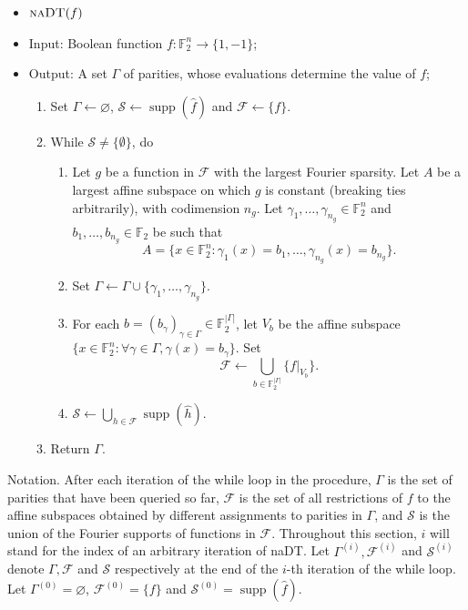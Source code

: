 \documentclass[11pt]{article}
\numberwithin{equation}{section}
\theoremstyle{definition}
\theoremstyle{plain}
\DeclareMathOperator{\Supp}{supp}
\newcommand{\F}{{\mathbb F}}
\begin{document}
\newcommand{\nadtproc}{\text{\sc naDT}}
\begin{itemize}
\item[] $\nadtproc(f)$
\item[] Input: Boolean function $f: \F_2^n \to \{1,-1\}$;
\item[] Output: A set $\Gamma$ of parities, whose evaluations determine the value of $f$;
\begin{enumerate}
\item Set $\Gamma \gets \varnothing$, $\mathcal{S} \gets\Supp(\widehat{f})$
  and 
  $\mathcal{F} \gets \{f\}$.
\item\label{step:while} While $\mathcal{S} \neq \{\emptyset\}$, do
\begin{enumerate}
\item\label{step:chooseg} Let $g$ be a function in $\mathcal{F}$ with the largest Fourier
  sparsity. Let $A$ be a largest
  affine subspace on which $g$ is constant (breaking ties arbitrarily), with codimension $n_g$.  Let $\gamma_1,\ldots,\gamma_{n_g} \in \F_2^n$ and
  $b_1, \ldots, b_{n_g} \in \mathbb{F}_2$ be such that
  \[
    A=\{x \in \F_2^n :
    \gamma_1(x)=b_1, \ldots, \gamma_{n_g}(x) = b_{n_g}\}.
  \]
\item Set $\Gamma \gets \Gamma \cup \{\gamma_1,\ldots,
  \gamma_{n_g}\}$.
\item For each $b=(b_\gamma)_{\gamma \in \Gamma} \in
  \mathbb{F}_2^{|\Gamma|}$, let $V_b$ be the affine subspace $\{x \in \F_2^n:
  \forall \gamma \in \Gamma, \gamma(x) = b_\gamma\}$.  Set
  \[
    \mathcal{F} \gets \bigcup_{b \in \mathbb{F}_2^{|\Gamma|}} \{f |_{V_b}\}.
  \]
\item $\mathcal{S} \gets \bigcup_{h \in \mathcal{F}} \Supp(\widehat{h})$.
\end{enumerate}
\item Return $\Gamma$.
\end{enumerate}
\end{itemize}
\noindent   %
Notation.  %
After each iteration of the while loop in the procedure,
$\Gamma$ is the set of parities that have been queried so far,
$\mathcal{F}$ is the set of all restrictions of $f$ to the affine
subspaces obtained by different assignments to parities in $\Gamma$,
and $\mathcal{S}$ is the union of the Fourier supports of functions in
$\mathcal{F}$. Throughout this section, $i$ will stand for the index of an arbitrary iteration
of {\sc naDT}. Let  $\Gamma^{(i)}, \mathcal{F}^{(i)}$ and
$\mathcal{S}^{(i)}$ denote $\Gamma, \mathcal{F}$ and $\mathcal{S}$
respectively at the end of the $i$-th iteration of the while loop. Let  $\Gamma^{(0)}=\varnothing$,  
$\mathcal{F}^{(0)}=\{f\}$ and $\mathcal{S}^{(0)}=\Supp(\widehat{f})$.
\end{document}
